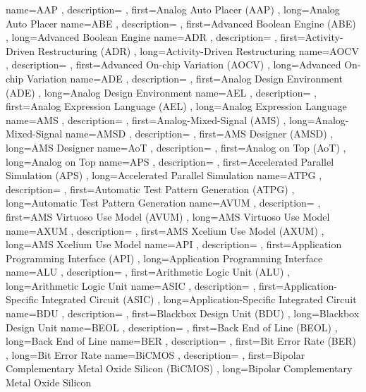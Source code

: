 { name={AAP}
, description={}
, first={Analog Auto Placer (AAP)}
, long={Analog Auto Placer}
}
{ name={ABE}
, description={}
, first={Advanced Boolean Engine (ABE)}
, long={Advanced Boolean Engine}
}
{ name={ADR}
, description={}
, first={Activity-Driven Restructuring (ADR)}
, long={Activity-Driven Restructuring}
}
{ name={AOCV}
, description={}
, first={Advanced On-chip Variation (AOCV)}
, long={Advanced On-chip Variation}
}
{ name={ADE}
, description={}
, first={Analog Design Environment (ADE)}
, long={Analog Design Environment}
}
{ name={AEL}
, description={}
, first={Analog Expression Language (AEL)}
, long={Analog Expression Language}
}
{ name={AMS}
, description={}
, first={Analog-Mixed-Signal (AMS)}
, long={Analog-Mixed-Signal}
}
{ name={AMSD}
, description={}
, first={AMS Designer (AMSD)}
, long={AMS Designer}
}
{ name={AoT}
, description={}
, first={Analog on Top (AoT)}
, long={Analog on Top}
}
{ name={APS}
, description={}
, first={Accelerated Parallel Simulation (APS)}
, long={Accelerated Parallel Simulation}
}
{ name={ATPG}
, description={}
, first={Automatic Test Pattern Generation (ATPG)}
, long={Automatic Test Pattern Generation}
}
{ name={AVUM}
, description={}
, first={AMS Virtuoso Use Model (AVUM)}
, long={AMS Virtuoso Use Model}
}
{ name={AXUM}
, description={}
, first={AMS Xcelium Use Model (AXUM)}
, long={AMS Xcelium Use Model}
}
{ name={API}
, description={}
, first={Application Programming Interface (API)}
, long={Application Programming Interface}
}
{ name={ALU}
, description={}
, first={Arithmetic Logic Unit (ALU)}
, long={Arithmetic Logic Unit}
}
{ name={ASIC}
, description={}
, first={Application-Specific Integrated Circuit (ASIC)}
, long={Application-Specific Integrated Circuit}
}
{ name={BDU}
, description={}
, first={Blackbox Design Unit (BDU)}
, long={Blackbox Design Unit}
}
{ name={BEOL}
, description={}
, first={Back End of Line (BEOL)}
, long={Back End of Line}
}
{ name={BER}
, description={}
, first={Bit Error Rate (BER)}
, long={Bit Error Rate}
}
{ name={BiCMOS}
, description={}
, first={Bipolar Complementary Metal Oxide Silicon (BiCMOS)}
, long={Bipolar Complementary Metal Oxide Silicon}
}
